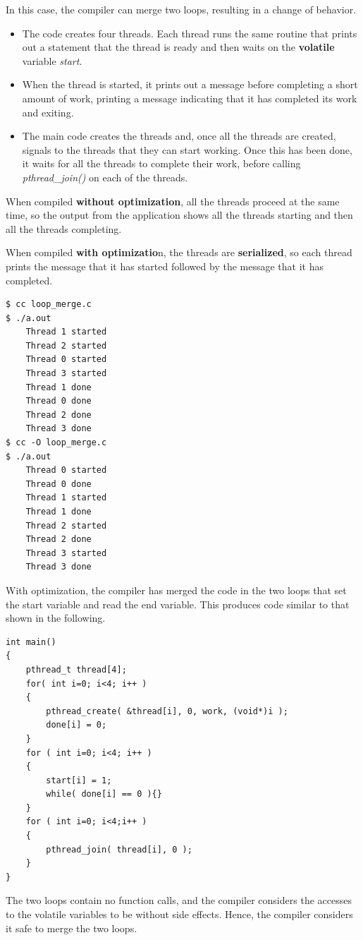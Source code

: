 \documentclass[12pt,a4paper]{report}
\begin{document}
In this case,  the compiler can merge two loops, resulting in a change of behavior.
\begin{itemize}
	\item The code creates four threads. Each thread runs the same routine that prints out a statement that the thread is ready and then waits on the \textbf{volatile} variable \textit{start}.
	\item When the thread is started, it prints out a message before completing a short amount of work, printing a message indicating that it has completed its work and exiting.
	\item The main code creates the threads and, once all the threads are created, signals to the threads that they can start working. Once this has been done, it waits for all the threads to complete their work, before calling \textit{pthread\_join()} on each of the threads.
\end{itemize}
When compiled \textbf{without optimization}, all the threads proceed at the same time, so the output from the application shows all the threads starting and then all the threads completing. 
\par
When compiled \textbf{with optimizatio}n, the threads are \textbf{serialized}, so each thread prints the message that it has started followed by the message that it has completed.
\begin{lstlisting}
$ cc loop_merge.c
$ ./a.out
	Thread 1 started
	Thread 2 started
	Thread 0 started
	Thread 3 started
	Thread 1 done
	Thread 0 done
	Thread 2 done
	Thread 3 done
$ cc -O loop_merge.c
$ ./a.out
	Thread 0 started
	Thread 0 done
	Thread 1 started
	Thread 1 done
	Thread 2 started
	Thread 2 done
	Thread 3 started
	Thread 3 done
\end{lstlisting}
With optimization, the compiler has merged the code in the two loops that set the start variable and read the end variable. This produces code similar to that shown in the following.
\begin{lstlisting}
int main()
{
	pthread_t thread[4];
	for( int i=0; i<4; i++ )
	{
		pthread_create( &thread[i], 0, work, (void*)i );
		done[i] = 0;
	}
	for ( int i=0; i<4; i++ )
	{
		start[i] = 1;
		while( done[i] == 0 ){}
	}
	for ( int i=0; i<4;i++ )
	{
		pthread_join( thread[i], 0 );
	}
}
\end{lstlisting}
The two loops contain no function calls, and the compiler considers the accesses to the volatile variables to be without side effects. Hence, the compiler considers it safe to merge the two loops.
\par
\end{document}
